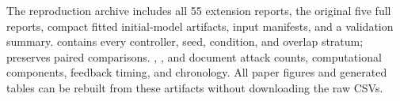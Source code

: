 The reproduction archive includes all 55 extension reports, the original five full reports, compact fitted initial-model artifacts, input manifests, and a validation summary.  contains every controller, seed, condition, and overlap stratum;  preserves paired comparisons. , , and  document attack counts, computational components, feedback timing, and chronology. All paper figures and generated tables can be rebuilt from these artifacts without downloading the raw CSVs.
